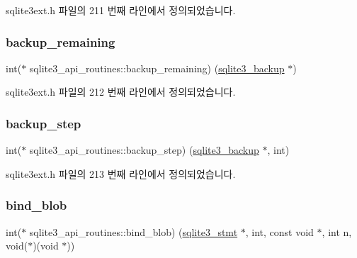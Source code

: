 sqlite3ext.\+h 파일의 211 번째 라인에서 정의되었습니다.

\mbox{\label{structsqlite3__api__routines_aff1d913159dfdfc5105e783ea9ec45f8}} 
\subsubsection{\texorpdfstring{backup\+\_\+remaining}{backup\_remaining}}
{\footnotesize\ttfamily int($\ast$ sqlite3\+\_\+api\+\_\+routines\+::backup\+\_\+remaining) (\hyperlink{sqlite3_8h_a758dbaa6678a107d36a2646342623635}{sqlite3\+\_\+backup} $\ast$)}



sqlite3ext.\+h 파일의 212 번째 라인에서 정의되었습니다.

\mbox{\label{structsqlite3__api__routines_ac21f3f6f76ad8f076e027fc3b85e2a6c}} 
\subsubsection{\texorpdfstring{backup\+\_\+step}{backup\_step}}
{\footnotesize\ttfamily int($\ast$ sqlite3\+\_\+api\+\_\+routines\+::backup\+\_\+step) (\hyperlink{sqlite3_8h_a758dbaa6678a107d36a2646342623635}{sqlite3\+\_\+backup} $\ast$, int)}



sqlite3ext.\+h 파일의 213 번째 라인에서 정의되었습니다.

\mbox{\label{structsqlite3__api__routines_a2e84de4afd1ba42151a75df4d7480a72}} 
\subsubsection{\texorpdfstring{bind\+\_\+blob}{bind\_blob}}
{\footnotesize\ttfamily int($\ast$ sqlite3\+\_\+api\+\_\+routines\+::bind\+\_\+blob) (\hyperlink{sqlite3_8h_af2a033da1327cdd77f0a174a09aedd0c}{sqlite3\+\_\+stmt} $\ast$, int, const void $\ast$, int n, void($\ast$)(void $\ast$))}



